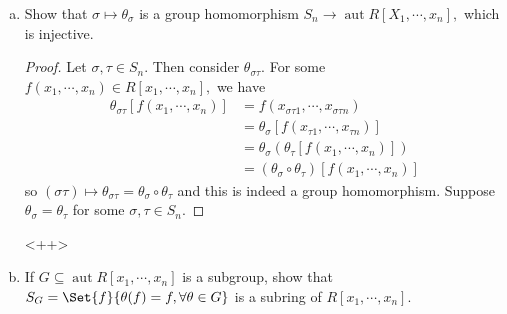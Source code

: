 \documentclass{article}
\DeclareMathOperator{\aut}{aut}
\begin{document}
\begin{itemize}
\begin{enumerate}[(a)]
			\item Show that $\sigma\mapsto \theta_\sigma$ is a group homomorphism $S_n\to \aut R[X_1, \cdots, x_n],$ which is injective.
				\begin{proof}
					Let $\sigma, \tau\in S_n.$ Then consider $\theta_{\sigma\tau}.$ For some $f(x_1, \cdots, x_n)\in R[x_1, \cdots, x_n],$ we have
					\begin{align*}
						\theta_{\sigma\tau}\left[ f(x_1, \cdots, x_n) \right] &= f(x_{\sigma\tau 1}, \cdots, x_{\sigma\tau n}) \\
						&= \theta_\sigma\left[ f(x_{\tau1}, \cdots, x_{\tau n}) \right] \\
						&= \theta_\sigma(\theta_\tau\left[ f(x_1, \cdots, x_n) \right]) \\
						&= (\theta_\sigma \circ \theta_\tau)\left[ f(x_1, \cdots, x_n) \right]
					\end{align*}
					so $(\sigma\tau)\mapsto \theta_{\sigma\tau} = \theta_\sigma\circ\theta_\tau$ and this is indeed a group homomorphism. Suppose $\theta_\sigma=\theta_\tau$ for some $\sigma, \tau\in S_n.$ 
				\end{proof}<++>

			\item If $G\subseteq \aut R[x_1, \cdots, x_n]$ is a subgroup, show that $S_G=\Set{f}{\theta(f)=f, \forall \theta\in G}$ is a subring of $R[x_1, \cdots, x_n].$
				
		\end{enumerate}
		
\end{itemize}
\end{document}

